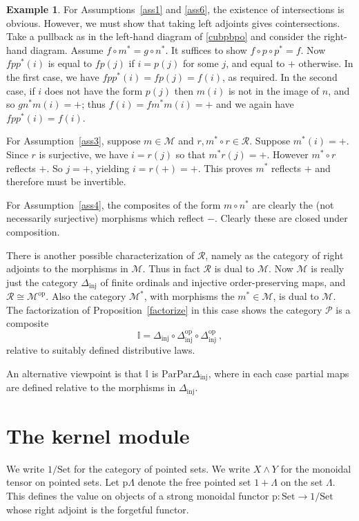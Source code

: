 \documentclass[a4paper,12pt,reqno]{amsart}
\theoremstyle{definition}
\newtheorem{example}[theorem]{Example}
\theoremstyle{fact}
\theoremstyle{genquest}
\theoremstyle{step}
\newcommand{\dd}{\colon}
\newcommand{\ra}{\rightarrow}
\def\CM{{\mathscr M}}
\def\CP{{\mathscr P}}
\def\CR{{\mathscr R}}
\begin{document}
\begin{example}
For Assumptions~\ref{ass1} and \ref{ass6}, the existence of intersections is obvious.
However, we must show that taking left adjoints gives cointersections.
Take a pullback as in the left-hand diagram of \eqref{cubpbpo} 
and consider the right-hand diagram.
Assume $f\circ m^*=g\circ n^*$.
It suffices to show $f\circ p\circ p^*=f$.
Now $fpp^*(i)$ is equal to $fp(j)$ if $i=p(j)$ for some $j$, and equal to $+$ otherwise.
In the first case, we have $fpp^*(i)=fp(j)=f(i)$, as required.
In the second case, if $i$ does not have the form $p(j)$ then
$m(i)$ is not in the image of $n$, and so $gn^* m(i)=+$;
thus $f(i)=fm^*m(i)=+$ and we again have $fpp^*(i)=f(i)$.

For Assumption~\ref{ass3}, suppose $m\in \CM$ and $r, m^*\circ r\in \CR$. 
Suppose $m^*(i)=+$. 
Since $r$ is surjective, we have $i=r(j)$ so that $m^*r(j)=+$.
However $m^*\circ r$ reflects $+$. So $j=+$, yielding $i=r(+)=+$.
This proves $m^*$ reflects $+$ and therefore must be invertible.

For Assumption~\ref{ass4}, the composites of the form $m\circ n^*$
are clearly the (not necessarily surjective) morphisms which reflect $-$.
Clearly these are closed under composition.

There is another possible characterization of $\CR$, namely as the category of right adjoints to the morphisms in $\CM$. 
Thus in fact $\CR$ is dual to $\CM$. 
Now $\CM$ is really just the category $\Delta_{\mathrm{inj}}$ of finite ordinals and injective order-preserving maps, 
and $\CR \cong \CM^{\mathrm{op}}$.
Also the category $\CM^*$, with morphisms the $m^*\in \CM$, is dual to $\CM$. 
The factorization of Proposition~\ref{factorize} in this case shows the category $\CP$ is a composite 
$$\mathbb{I} = \Delta_{\mathrm{inj}}\circ \Delta_{\mathrm{inj}}^{\mathrm{op}}\circ \Delta_{\mathrm{inj}}^{\mathrm{op}} \ ,$$
relative to suitably defined distributive laws.

An alternative viewpoint is that $\mathbb{I}$ is 
$\mathrm{Par}\mathrm{Par}\Delta_{\mathrm{inj}}$,
where in each case partial maps are defined relative to the morphisms in 
$\Delta_{\mathrm{inj}}$. 
\end{example}

\section{The kernel module}\label{ker}

We write $1/\mathrm{Set}$ for the category of pointed sets.
We write $X \wedge Y$ for the monoidal tensor on pointed sets.
Let $\mathrm{p}\Lambda$ denote the free pointed set 
$1+\Lambda$ on the set $\Lambda$.
This defines the value on objects of a strong monoidal functor 
$\mathrm{p} \dd \mathrm{Set} \ra 1/\mathrm{Set}$
whose right adjoint is the forgetful functor.
\end{document}

